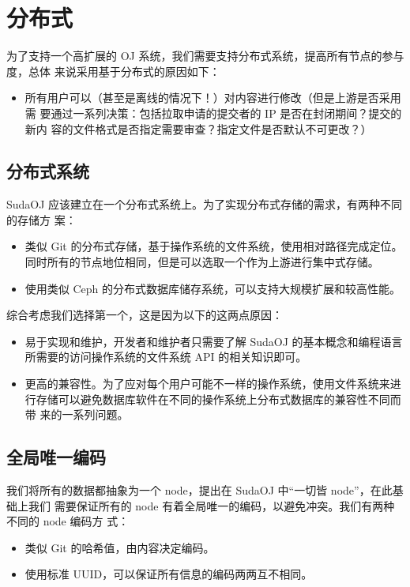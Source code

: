 
\section{分布式} \label{fenbushi}

为了支持一个高扩展的 OJ 系统，我们需要支持分布式系统，提高所有节点的参与度，总体
来说采用基于分布式的原因如下：

\begin{itemize}
    \item 所有用户可以（甚至是离线的情况下！）对内容进行修改（但是上游是否采用需
        要通过一系列决策：包括拉取申请的提交者的 IP 是否在封闭期间？提交的新内
        容的文件格式是否指定需要审查？指定文件是否默认不可更改？）
\end{itemize}

\subsection{分布式系统}
SudaOJ 应该建立在一个分布式系统上。为了实现分布式存储的需求，有两种不同的存储方
案：

\begin{itemize}
    \item 类似 Git 的分布式存储，基于操作系统的文件系统，使用相对路径完成定位。
        同时所有的节点地位相同，但是可以选取一个作为上游进行集中式存储。
    \item 使用类似 Ceph 的分布式数据库储存系统，可以支持大规模扩展和较高性能。
\end{itemize}

综合考虑我们选择第一个，这是因为以下的这两点原因：
\begin{itemize}
    \item 易于实现和维护，开发者和维护者只需要了解 SudaOJ 的基本概念和编程语言
        所需要的访问操作系统的文件系统 API 的相关知识即可。
    \item 更高的兼容性。为了应对每个用户可能不一样的操作系统，使用文件系统来进
        行存储可以避免数据库软件在不同的操作系统上分布式数据库的兼容性不同而带
        来的一系列问题。
\end{itemize}

\subsection{全局唯一编码}
我们将所有的数据都抽象为一个 node，提出在 SudaOJ 中“一切皆 node”，在此基础上我们
需要保证所有的 node 有着全局唯一的编码，以避免冲突。我们有两种不同的 node 编码方
式：
\begin{itemize}
    \item 类似 Git 的哈希值，由内容决定编码。
    \item 使用标准 UUID，可以保证所有信息的编码两两互不相同。
\end{itemize}

